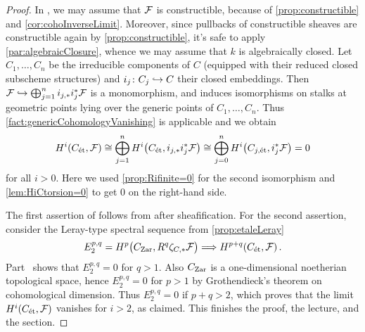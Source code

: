 \begin{proof}
	In , we may assume that $\mathcal{F}$ is constructible, because of \cref{prop:constructible} and \cref{cor:cohoInverseLimit}. Moreover, since pullbacks of constructible sheaves are constructible again by \cref{prop:constructible}, it's safe to apply \cref{par:algebraicClosure}, whence we may assume that $k$ is algebraically closed. Let $C_1,\dotsc,C_n$ be the irreducible components of $C$ (equipped with their reduced closed subscheme structures) and $i_j\colon C_j\monomorphism C$ their closed embeddings. Then $\Ff\monomorphism \bigoplus_{j=1}^ni_{j,*}i_j^*\Ff$ is a monomorphism, and induces isomorphisms on stalks at geometric points lying over the generic points of $C_1,\dotsc,C_n$. Thus \cref{fact:genericCohomologyVanishing} is applicable and we obtain
	\begin{equation*}
		H^i(C_{\mathrm{\acute{e}t}},\mathcal{F})\cong \bigoplus_{j=1}^nH^i\big(C_{\mathrm{\acute{e}t}},i_{j,*}i_j^*\mathcal{F}\big)\cong \bigoplus_{j=0}^nH^i\big(C_{j,\mathrm{\acute{e}t}},i_j^*\mathcal{F}\big)=0
	\end{equation*}
	for all $i>0$. Here we used \cref{prop:Rifinite=0} for the second isomorphism and \cref{lem:HiCtorsion=0} to get $0$ on the right-hand side.
	
	The first assertion of  follows from  after sheafification. For the second assertion, consider the Leray-type spectral sequence from \cref{prop:etaleLeray}
	\begin{equation*}
		E_2^{p,q}=H^p\big(C_\Zar,R^q\zeta_{C,*}\Ff\big)\converge H^{p+q}(C_\et,\Ff)\,.
	\end{equation*}
	Part~ shows that $E_2^{p,q}=0$ for $q>1$. Also $C_{\mathrm{Zar}}$ is a one-dimensional noetherian topological space, hence $E_2^{p,q}=0$ for $p>1$ by Grothendieck's theorem on cohomological dimension. Thus $E_2^{p,q}=0$ if $p+q>2$, which proves that the limit $H^i(C_{\mathrm{\acute{e}t}},\mathcal{F})$ vanishes for $i>2$, as claimed. This finishes the proof, the lecture, and the section.
\end{proof}